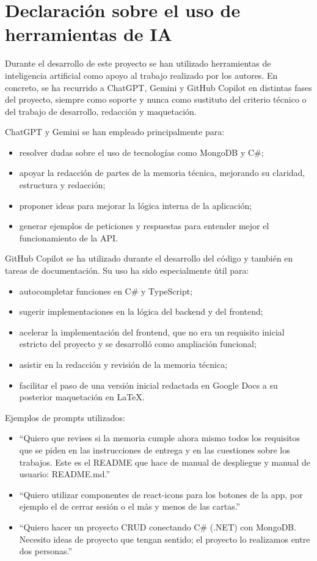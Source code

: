 \chapter{Declaración sobre el uso de herramientas de IA}

Durante el desarrollo de este proyecto se han utilizado herramientas de inteligencia artificial como apoyo 
al trabajo realizado por los autores. En concreto, se ha recurrido a ChatGPT, Gemini y GitHub Copilot en 
distintas fases del proyecto, siempre como soporte y nunca como sustituto del criterio técnico o del trabajo 
de desarrollo, redacción y maquetación.

ChatGPT y Gemini se han empleado principalmente para:
\begin{itemize}
    \item resolver dudas sobre el uso de tecnologías como MongoDB y C\#;
    \item apoyar la redacción de partes de la memoria técnica, mejorando su claridad, estructura y redacción;
    \item proponer ideas para mejorar la lógica interna de la aplicación;
    \item generar ejemplos de peticiones y respuestas para entender mejor el funcionamiento de la API.
\end{itemize}

GitHub Copilot se ha utilizado durante el desarrollo del código y también en tareas de documentación. Su uso ha sido especialmente útil para:
\begin{itemize}
    \item autocompletar funciones en C\# y TypeScript;
    \item sugerir implementaciones en la lógica del backend y del frontend;
    \item acelerar la implementación del frontend, que no era un requisito inicial estricto del proyecto y se desarrolló como ampliación funcional;
    \item asistir en la redacción y revisión de la memoria técnica;
    \item facilitar el paso de una versión inicial redactada en Google Docs a su posterior maquetación en LaTeX.
\end{itemize}

Ejemplos de prompts utilizados:
\begin{itemize}
    \item ``Quiero que revises si la memoria cumple ahora mismo todos los requisitos que se piden en las instrucciones de entrega y en las cuestiones sobre los trabajos. Este es el README que hace de manual de despliegue y manual de usuario: README.md.''
    \item ``Quiero utilizar componentes de react-icons para los botones de la app, por ejemplo el de cerrar sesión o el más y menos de las cartas.''
    \item ``Quiero hacer un proyecto CRUD conectando C\# (.NET) con MongoDB. Necesito ideas de proyecto que tengan sentido; el proyecto lo realizamos entre dos personas.''
\end{itemize}

